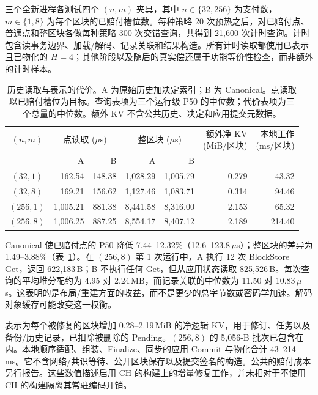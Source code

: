 三个全新进程各测试四个 $(n,m)$ 夹具，其中 $n\in\{32,256\}$ 为支付数，$m\in\{1,8\}$ 为每个区块的已赔付槽位数。每种策略 20 次预热之后，对已赔付点、普通点和整区块各做每种策略 300 次交错查询，共得到 21,600 次计时查询。计时包含读事务边界、加载/解码、记录关联和结果构造。所有计时读取都使用已表示且已物化的 $H=4$；其他阶段以及随后的真实偿还属于功能等价性检查，而非额外的计时样本。

\begin{table}[t]
  \caption{历史读取与表示的代价。A 为原始历史加决定索引；B 为 Canonical。点读取以已赔付槽位为目标。查询表项为三个运行级 P50 的中位数；代价表项为三个总量的中位数。额外 KV 不含公共历史、决定和应用提交元数据。}
  \label{tab:eval-reader}
  \centering
  \small
  \setlength{\tabcolsep}{8pt}
  \begin{tabular}{@{}crrrrrr@{}}
    \toprule
    $(n,m)$ &
    \multicolumn{2}{c}{点读取 ($\mu$s)} &
    \multicolumn{2}{c}{整区块 ($\mu$s)} &
    \shortstack{额外净 KV\\(MiB/区块)} &
    \shortstack{本地工作\\(ms/区块)} \\
    \cmidrule(lr){2-3}\cmidrule(lr){4-5}
    & A & B & A & B & & \\
    \midrule
    $(32,1)$  & 162.54  & 148.38 & 1,028.29 & 1,005.79 & 0.279 & 43.32 \\
    $(32,8)$  & 169.21  & 156.62 & 1,127.46 & 1,083.71 & 0.314 & 94.46 \\
    $(256,1)$ & 1,005.21 & 881.38 & 8,441.58 & 8,316.00 & 2.153 & 65.32 \\
    $(256,8)$ & 1,006.25 & 887.25 & 8,554.17 & 8,407.12 & 2.189 & 214.40 \\
    \bottomrule
  \end{tabular}
\end{table}

Canonical 使已赔付点的 P50 降低 7.44--12.32\%（12.6--123.8\,$\mu$s）；整区块的差异为 1.49--3.88\%（表~\ref{tab:eval-reader}）。在 $(256,8)$ 第 1 次运行中，A 执行 12 次 BlockStore Get，返回 622,183\,B；B 不执行任何 Get，但从应用状态读取 825,526\,B。每次查询的平均堆分配约为 4.95 对 2.24\,MB，而记录关联的中位数为 11.50 对 10.83\,$\mu$s。这表明的是布局/重建方面的收益，而不是更少的总字节数或密码学加速。解码对象缓存可能改变这一权衡。

表示为每个被修复的区块增加 0.28--2.19\,MiB 的净逻辑 KV，用于修订、任务以及备份/历史记录，已扣除被删除的 Pending。$(256,8)$ 的 5,056-B 批次已包含在内。本地顺序适配、组装、Finalize、同步的应用 Commit 与物化合计 43--214\,ms。它不含网络/共识等待、公开区块保存以及提交签名的构造。公共的赔付成本另行报告。这些数值描述启用 CH 的构建上的增量修复工作，并未相对于不使用 CH 的构建隔离其常驻编码开销。

